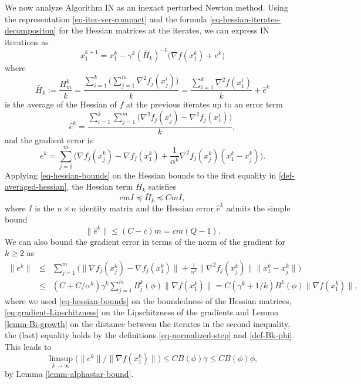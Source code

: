 \documentclass[final,numbook]{svjour3}
\begin{document}
We now analyze Algorithm IN as an inexact perturbed Newton method. 
Using the representation \eqref{eq-iter-ver-compact} and the formula \eqref{eq-hessian-iterates-decompositon} for the Hessian matrices at the iterates, we can express IN iterations as 
\begin{equation}\label{eq-iter-newton-via-error} x_1^{k+1} = x_1^k - \gamma^k (\bar{H}_k)^{-1}\big(\nabla f(x_1^k) + e^k \big) 
\end{equation}
where \begin{equation}\label{def-averaged-hessian} \bar{H}_k := \frac{H_m^k}{k} =  \frac{\sum_{i=1}^k \big( \sum_{j=1}^m \nabla^2 f_j(x_j^i) \big) }{k} = \frac{\sum_{i=1}^k  \nabla^2 f(x_1^i)  }{k} + \widehat{e}^k
\end{equation}
is the average of the Hessian of $f$ at the previous iterates up to an error term 
\begin{equation}\label{eq-hessian-error-in-IN} \widehat{e}^k = \frac{\sum_{i=1}^k  \sum_{j=1}^m \bigg( \nabla^2 f_j(x_j^i) - \nabla^2 f_j(x_1^i)\bigg) }{k}, 
\end{equation} 
and the gradient error is 
\begin{equation}\label{eq-grad-error-alg2}
e^k = \sum_{j=1}^m \bigg(\nabla f_j (x_j^k)-\nabla f_j (x_1^k) + \frac{1}{\alpha^k} \nabla^2 f_j(x_j^k)(x_1^k - x_j^k) \bigg). 
\end{equation}
Applying \eqref{eq-hessian-bounds} on the Hessian bounds to the first equality in \eqref{def-averaged-hessian}, the Hessian term $\bar{H}_k $ satisfies  
   \begin{equation}\label{eq-averaged-hessian-bounds} {c} mI \preceq \bar{H}_k \preceq {C} mI, 
   \end{equation} 
where $I$ is the $n\times n$ identity matrix and the Hessian error $\widehat{e}^k$ admits the simple bound
  \begin{equation}\label{ineq-hessian-error-trivial-bd} \|\widehat{e}^k\| \leq ({C} - {c})m=cm(Q-1).
  \end{equation}
We can also bound the gradient error in terms of the norm of the gradient for $k\geq 2$ as
\begin{eqnarray*}
\|e^k\| &\leq & \sum_{j=1}^m \bigg(\| \nabla f_j (x_j^k)-\nabla f_j (x_1^k)\| + \frac{1}{\alpha^k}  \|\nabla^2 f_j(x_j^k)\| \|x_1^k - x_j^k \| \bigg) \\
&\leq& (C + {C}/\alpha^k) \gamma^k \sum_{j=1}^m B_j^k(\phi)  \| \nabla f(x_1^k) \|  =  {C(\gamma^k + 1/k)} B^k(\phi) \|\nabla f(x_1^k) \|,
\end{eqnarray*}
where we used \eqref{eq-hessian-bounds} on the boundedness of the Hessian matrices, \eqref{eq:gradient-Lipschitzness} on the Lipschitzness of the gradients and Lemma \ref{lemm-Bi-growth} on the distance between the iterates in the second inequality, the (last) equality holds by the definitions \eqref{eq-normalized-step} and \eqref{def-Bk-phi}. This leads to 
\begin{equation}\label{eq-limsup-grad-error}
	\limsup_{k\to\infty} \bigg(\| e^k \| / \|\nabla f(x_1^k) \|\bigg) \leq CB(\phi){{\overline{\gamma}}}
	\leq CB(\phi)\phi,
\end{equation}
by Lemma \ref{lemm-alphastar-bound}. 
\end{document}
